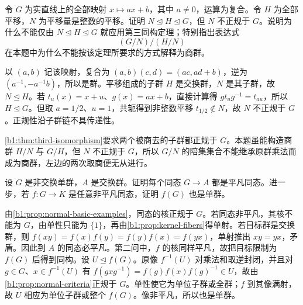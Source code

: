 \begin{exercise}\label{b1:ex:02-normal-not-transitive}
	令 \(G\) 为实直线上的全部映射 \(x\mapsto ax+b\)，其中 \(a\ne0\)，运算为复合。令 \(H\) 为全部平移，\(N\) 为平移量是整数的平移。证明 \(N\trianglelefteq H\trianglelefteq G\)，但 \(N\) 不正规于 \(G\)。说明为什么不能仅由 \(N\trianglelefteq H\trianglelefteq G\) 就应用第三同构定理；特别指出表达式
	\[
		(G/N)/(H/N)
	\]
	在本题中为什么不能按该定理所要求的方式解释为商群。
\end{exercise}
\begin{solution}
	以 \((a,b)\) 记该映射，复合为 \((a,b)(c,d)=(ac,ad+b)\)，逆为 \((a^{-1},-a^{-1}b)\)，所以是群。平移组成的子群 \(H\) 是交换群，\(N\) 是其子群，故 \(N\trianglelefteq H\)。若 \(t_u(x)=x+u\)、\(g(x)=ax+b\)，直接计算得 \(gt_ug^{-1}=t_{au}\)，所以 \(H\trianglelefteq G\)。但取 \(a=1/2\)、\(u=1\)，共轭得到非整数平移 \(t_{1/2}\notin N\)，故 \(N\) 不正规于 \(G\)。正规性沿子群链不具传递性。

	\cref{b1:thm:third-isomorphism}要求两个被商去的子群都正规于 \(G\)。本题虽能构造商群 \(H/N\) 与 \(G/H\)，但 \(N\) 不正规于 \(G\)，所以 \(G/N\) 的陪集集合不能继承原群乘法而成为商群，左边的两次取商便无从进行。
\end{solution}

\begin{exercise}\label{b1:ex:02-simple-abelian-target}
	设 \(G\) 是非交换单群，\(A\) 是交换群。证明每个同态 \(G\rightarrow A\) 都是平凡同态。进一步，若 \(f:G\rightarrow K\) 是任意非平凡同态，证明 \(f(G)\) 也是单群。
\end{exercise}
\begin{solution}
	由\cref{b1:prop:normal-basic-examples}，同态的核正规于 \(G\)。若同态非平凡，其核不能为 \(G\)，由单性只能为 \(\{1\}\)，再由\cref{b1:prop:kernel-fibers}得单射。若目标群是交换群，则 \(f(xy)=f(x)f(y)=f(y)f(x)=f(yx)\)，单射推出 \(xy=yx\)，矛盾。因此到 \(A\) 的同态必平凡。第二问中，\(f\) 的核同样平凡，故把目标限制为 \(f(G)\) 后得到同构。设 \(U\trianglelefteq f(G)\)。原像 \(f^{-1}(U)\) 对乘法和取逆封闭，并且对 \(g\in G\)、\(x\in f^{-1}(U)\) 有 \(f(gxg^{-1})=f(g)f(x)f(g)^{-1}\in U\)，故由\cref{b1:prop:normal-criteria}正规于 \(G\)。单性使它为单位子群或全群；\(f\) 到其像满射，故 \(U\) 相应为单位子群或整个 \(f(G)\)。像非平凡，所以也是单群。
\end{solution}


